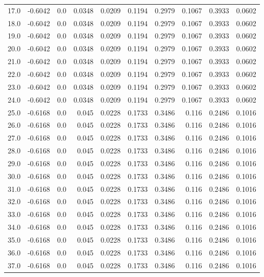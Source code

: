 \begin{longtable}{lrrrrrrrrr}
17.0 & -0.6042 & 0.0 & 0.0348 & 0.0209 & 0.1194 & 0.2979 & 0.1067 & 0.3933 & 0.0602 \\
18.0 & -0.6042 & 0.0 & 0.0348 & 0.0209 & 0.1194 & 0.2979 & 0.1067 & 0.3933 & 0.0602 \\
19.0 & -0.6042 & 0.0 & 0.0348 & 0.0209 & 0.1194 & 0.2979 & 0.1067 & 0.3933 & 0.0602 \\
20.0 & -0.6042 & 0.0 & 0.0348 & 0.0209 & 0.1194 & 0.2979 & 0.1067 & 0.3933 & 0.0602 \\
21.0 & -0.6042 & 0.0 & 0.0348 & 0.0209 & 0.1194 & 0.2979 & 0.1067 & 0.3933 & 0.0602 \\
22.0 & -0.6042 & 0.0 & 0.0348 & 0.0209 & 0.1194 & 0.2979 & 0.1067 & 0.3933 & 0.0602 \\
23.0 & -0.6042 & 0.0 & 0.0348 & 0.0209 & 0.1194 & 0.2979 & 0.1067 & 0.3933 & 0.0602 \\
24.0 & -0.6042 & 0.0 & 0.0348 & 0.0209 & 0.1194 & 0.2979 & 0.1067 & 0.3933 & 0.0602 \\
25.0 & -0.6168 & 0.0 & 0.045 & 0.0228 & 0.1733 & 0.3486 & 0.116 & 0.2486 & 0.1016 \\
26.0 & -0.6168 & 0.0 & 0.045 & 0.0228 & 0.1733 & 0.3486 & 0.116 & 0.2486 & 0.1016 \\
27.0 & -0.6168 & 0.0 & 0.045 & 0.0228 & 0.1733 & 0.3486 & 0.116 & 0.2486 & 0.1016 \\
28.0 & -0.6168 & 0.0 & 0.045 & 0.0228 & 0.1733 & 0.3486 & 0.116 & 0.2486 & 0.1016 \\
29.0 & -0.6168 & 0.0 & 0.045 & 0.0228 & 0.1733 & 0.3486 & 0.116 & 0.2486 & 0.1016 \\
30.0 & -0.6168 & 0.0 & 0.045 & 0.0228 & 0.1733 & 0.3486 & 0.116 & 0.2486 & 0.1016 \\
31.0 & -0.6168 & 0.0 & 0.045 & 0.0228 & 0.1733 & 0.3486 & 0.116 & 0.2486 & 0.1016 \\
32.0 & -0.6168 & 0.0 & 0.045 & 0.0228 & 0.1733 & 0.3486 & 0.116 & 0.2486 & 0.1016 \\
33.0 & -0.6168 & 0.0 & 0.045 & 0.0228 & 0.1733 & 0.3486 & 0.116 & 0.2486 & 0.1016 \\
34.0 & -0.6168 & 0.0 & 0.045 & 0.0228 & 0.1733 & 0.3486 & 0.116 & 0.2486 & 0.1016 \\
35.0 & -0.6168 & 0.0 & 0.045 & 0.0228 & 0.1733 & 0.3486 & 0.116 & 0.2486 & 0.1016 \\
36.0 & -0.6168 & 0.0 & 0.045 & 0.0228 & 0.1733 & 0.3486 & 0.116 & 0.2486 & 0.1016 \\
37.0 & -0.6168 & 0.0 & 0.045 & 0.0228 & 0.1733 & 0.3486 & 0.116 & 0.2486 & 0.1016 \\

\end{longtable}
